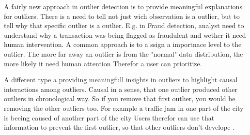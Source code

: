 A fairly new approach in outlier detection is to provide meaningful explanations for outliers.
There is a need to tell not just wich observation is a outlier, but to tell why that specific outlier is a outlier.
E.g. in Fraud detection, analyst need to understand why a transaction was being flagged as fraudulent and wether it need human intervention.
A common approach is to a ssign a importnace level to the outlier.
The more far away an outlier is from the "normal" data distribution, the more likely it need human attention 
Therefor a user can prioritize. 


A different type a providing meaningfull insights in outliers to highlight causal interactions among outliers. 
Causal in a sense, that one outlier produced other outliers in chronological way.
So if you remove that first outlier, you would be removing the other outliers too.
For example a traffic jam in one part of the city is beeing caused of another part of the city
Users therefor can use that information to prevent the first outlier, so that other outliers don't develope \citep{panjei2022survey}.



